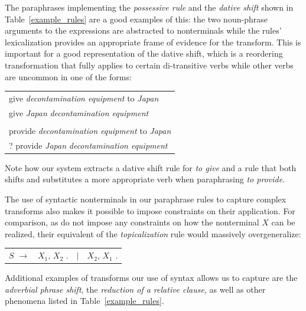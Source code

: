 \documentclass[11pt]{article}
\begin{document}
The paraphrases implementing the \emph{possessive rule} and the
\emph{dative shift} shown in Table~\ref{example_rules} are a good
examples of this: the two noun-phrase arguments to the expressions are
abstracted to nonterminals while the rules' lexicalization provides an
appropriate frame of evidence for the transform. This is important for
a good representation of the dative shift, which is a reordering
transformation that fully applies to certain di-transitive verbs while
other verbs are uncommon in one of the forms:
\begin{center}
\begin{tabular}{l}
  give \emph{decontamination equipment} to \emph{Japan} \\
  give \emph{Japan} \emph{decontamination equipment} \\
  \vspace{-10pt}\\
  provide \emph{decontamination equipment} to \emph{Japan} \\
  ? provide \emph{Japan} \emph{decontamination equipment} \\
\end{tabular}
\end{center}
Note how our system extracts a dative shift rule for \emph{to give}
and a rule that both shifts and substitutes a more appropriate verb
when paraphrasing \emph{to provide}.

The use of syntactic nonterminals in our paraphrase rules to capture
complex transforms also makes it possible to impose constraints on
their application. For comparison, as  do not
impose any constraints on how the nonterminal $X$ can be realized,
their equivalent of the \emph{topicalization} rule would massively
overgeneralize:
\begin{center}
\begin{tabular}{rrcl}
  $\mathit{S}$ $\rightarrow$ & $\mathit{X}_1$,
  $\mathit{X}_2$ . & $\mid$ & $\mathit{X}_2$, $\mathit{X}_1$ . \\
\end{tabular}
\end{center}
Additional examples of transforms our use of syntax allows us to
capture are the \emph{adverbial phrase shift}, the \emph{reduction of
  a relative clause}, as well as other phenomena listed in
Table~\ref{example_rules}.
 
\end{document}
